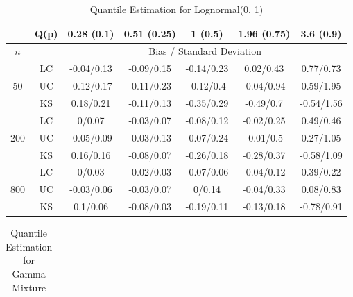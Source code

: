 \documentclass[10pt]{article}
\begin{document}
\begin{center}
\begin{table}[H]
\begin{tabular} {| c | c | c | c | c | c | c | }
\end{tabular}

\end{table}

\begin{table}[H]

\caption{Quantile Estimation for Lognormal(0, 1)}
  
\begin{tabular} {| c | c | c | c | c | c | c | } 

	 \hline
		&Q(p)&	0.28 (0.1)&	0.51 (0.25)&	1 (0.5)&	1.96 (0.75)&	3.6 (0.9)\\ 
 \hline 
 	$n$ & & \multicolumn{5}{|c|}{Bias / Standard Deviation} 
 \\ 
 \hline 
\multirow{3}{*}{50}		&	LC	&-0.04/0.13	&-0.09/0.15	&-0.14/0.23	&0.02/0.43	&0.77/0.73\\ 
			&	UC	&-0.12/0.17	&-0.11/0.23	&-0.12/0.4	&-0.04/0.94	&0.59/1.95\\ 
			&	KS	&0.18/0.21	&-0.11/0.13	&-0.35/0.29	&-0.49/0.7	&-0.54/1.56\\ 
	\hline 
\multirow{3}{*}{200}		&	LC	&0/0.07	&-0.03/0.07	&-0.08/0.12	&-0.02/0.25	&0.49/0.46\\ 
			&	UC	&-0.05/0.09	&-0.03/0.13	&-0.07/0.24	&-0.01/0.5	&0.27/1.05\\ 
			&	KS	&0.16/0.16	&-0.08/0.07	&-0.26/0.18	&-0.28/0.37	&-0.58/1.09\\ 
	\hline 
\multirow{3}{*}{800}		&	LC	&0/0.03	&-0.02/0.03	&-0.07/0.06	&-0.04/0.12	&0.39/0.22\\ 
			&	UC	&-0.03/0.06	&-0.03/0.07	&0/0.14	&-0.04/0.33	&0.08/0.83\\ 
			&	KS	&0.1/0.06	&-0.08/0.03	&-0.19/0.11	&-0.13/0.18	&-0.78/0.91\\ 
	\hline 

\end{tabular}

\end{table}

\begin{table}[H]

\caption{Quantile Estimation for Gamma Mixture}

\begin{tabular} {| c | c | c | c | c | c | c | } 


\end{tabular}
\end{table}
\end{center}
\end{document}
